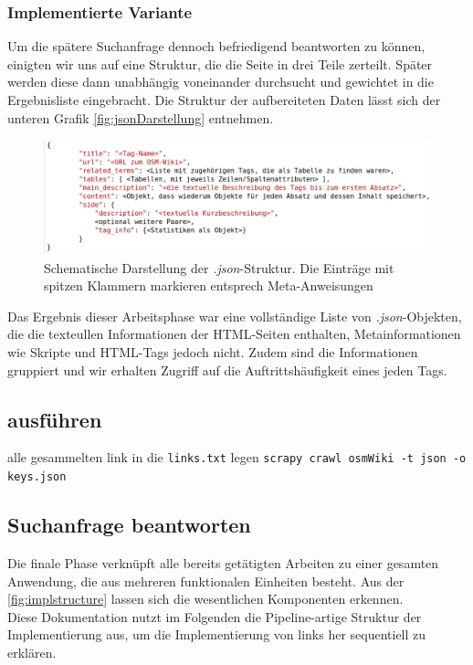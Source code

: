 \documentclass[12pt,pdftex,a4paper]{article}
\begin{document}
\subsubsection{Implementierte Variante}
Um die spätere Suchanfrage dennoch befriedigend beantworten zu können, einigten wir uns auf eine Struktur, die die Seite in drei Teile zerteilt. Später werden diese dann unabhängig voneinander durchsucht und gewichtet in die Ergebnisliste eingebracht. Die Struktur der aufbereiteten Daten lässt sich der unteren Grafik \autoref{fig:jsonDarstellung} entnehmen.\\
\begin{figure}[h]
	\centering
	\includegraphics[width=0.9\linewidth]{Bilder/json_structure}
	\caption[Schematische Darstellung]{Schematische Darstellung der \textit{.json}-Struktur. Die Einträge mit spitzen Klammern markieren entsprech Meta-Anweisungen}
	\label{fig:jsonDarstellung}
\end{figure}
Das Ergebnis dieser Arbeitsphase war eine vollständige Liste von \textit{.json}-Objekten, die die texteullen Informationen der HTML-Seiten enthalten, Metainformationen wie Skripte und HTML-Tags jedoch nicht. Zudem sind die Informationen gruppiert und wir erhalten Zugriff auf die Auftrittshäufigkeit eines jeden Tags.

\subsection{ausführen}
alle gesammelten link in die \texttt{links.txt} legen
\texttt{scrapy crawl osmWiki -t json -o keys.json}

\subsection{Suchanfrage beantworten}
Die finale Phase verknüpft alle bereits getätigten Arbeiten zu einer gesamten Anwendung, die aus mehreren funktionalen Einheiten besteht. Aus der \autoref{fig:implstructure} lassen sich die wesentlichen Komponenten erkennen. \\
Diese Dokumentation nutzt im Folgenden die Pipeline-artige Struktur der Implementierung aus, um die Implementierung von links her sequentiell zu erklären.
\end{document}
